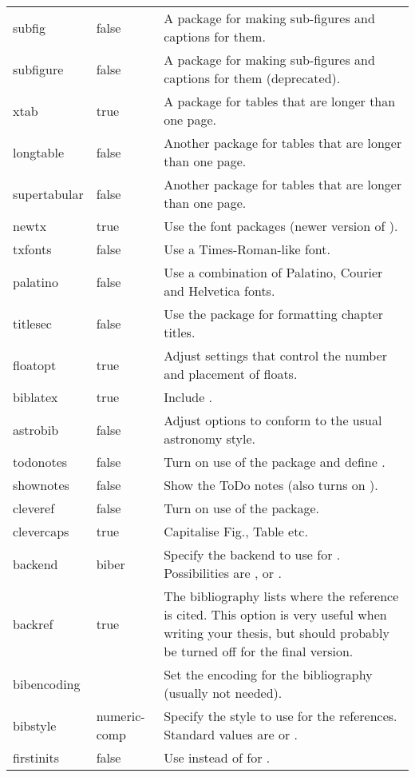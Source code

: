 \begin{xtabular}{llp{11.0cm}}
  subfig & false & A package for making sub-figures and captions for them.\\
  subfigure & false & A package for making sub-figures and captions for them (deprecated).\\
  xtab & true & A package for tables that are longer than one page.\\
  longtable & false &  Another package for tables that are longer than one page.\\
  supertabular & false &  Another package for tables that are longer than one page.\\
  newtx & true & Use the  font packages (newer version of ).\\
  txfonts & false & Use a Times-Roman-like font.\\
  palatino & false & Use a combination of Palatino, Courier and Helvetica fonts.\\
  titlesec & false & Use the  package for formatting chapter titles.\\
  floatopt & true & Adjust settings that control the number and placement of floats.\\
  biblatex & true & Include .\\
  astrobib & false & Adjust  options to conform to the usual astronomy style.\\
  todonotes & false & Turn on use of the  package and define .\\
  shownotes & false & Show the ToDo notes (also turns on ).\\
  cleveref & false & Turn on use of the  package.\\
  clevercaps & true & Capitalise Fig., Table etc.\\
  backend & biber & Specify the backend to use for .
    Possibilities are ,  or .\\
  backref & true & The bibliography lists where the reference is cited.
    This option is very useful when writing your thesis,
    but should probably be turned off for the final version.\\
  bibencoding & & Set the encoding for the bibliography (usually not needed).\\
  bibstyle & numeric-comp & Specify the style to use for the references.
    Standard values are  or .\\
  firstinits & false & Use  instead of  for .\\
\end{xtabular}

